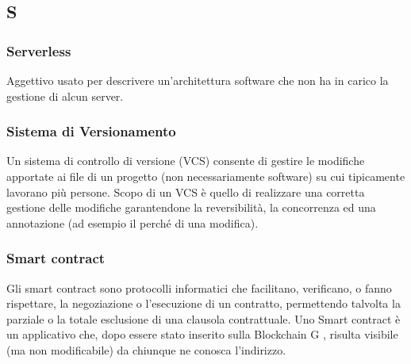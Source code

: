 \subsection*{\textbf{\hfill \Huge{S} \hfill}} 
\subsubsection*{Serverless}
Aggettivo usato per descrivere un’architettura software che non ha in carico la gestione di alcun server.
\subsubsection*{Sistema di Versionamento}
Un sistema di controllo di versione (VCS) consente di gestire le modifiche apportate ai file di un progetto (non necessariamente software) su cui tipicamente lavorano più persone. Scopo di un VCS è quello di realizzare una corretta gestione delle modifiche garantendone la reversibilità, la concorrenza ed una annotazione (ad esempio il perché di una modifica).
\subsubsection*{Smart contract}
Gli smart contract sono protocolli informatici che facilitano, verificano, o fanno rispettare, la negoziazione o l’esecuzione di un contratto, permettendo talvolta la parziale o la totale esclusione di una clausola contrattuale. Uno Smart contract è un applicativo che, dopo essere stato inserito sulla Blockchain G , risulta visibile (ma non modificabile) da chiunque ne conosca l’indirizzo.

